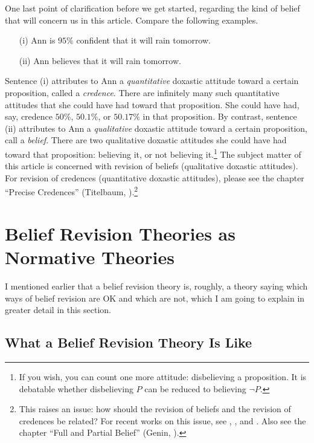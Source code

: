 One last point of clarification before we get started, regarding the kind of belief that will concern us in this article. Compare the following examples.
\begin{itemize}
	\item[(i)]  Ann is $95\%$ confident that it will rain tomorrow.
	\item[(ii)] Ann believes that it will rain tomorrow.
\end{itemize}
Sentence (i) attributes to Ann a {\em quantitative} doxastic attitude toward a certain proposition, called a {\em credence}. There are infinitely many such quantitative attitudes that she could have had toward that proposition. She could have had, say, credence $50\%$, $50.1\%$, or $50.17\%$ in that proposition. By contrast, sentence (ii) attributes to Ann a {\em qualitative} doxastic attitude toward a certain proposition, call a {\em belief}. There are two qualitative doxastic attitudes she could have had toward that proposition: believing it, or not believing it.\footnote
	{If you wish, you can count one more attitude: disbelieving a proposition. It is debatable whether disbelieving $P$ can be reduced to believing $\neg P$.} 
The subject matter of this article is concerned with revision of beliefs (qualitative doxastic attitudes). For revision of credences (quantitative doxastic attitudes), please see the chapter ``Precise Credences'' (Titelbaum, ).\footnote
	{This raises an issue: how should the revision of beliefs and the revision of credences be related? For recent works on this issue, see \citet*{arlo2012belief}, \citet*{lin2012propositional}, and \citet{leitgeb2014stability}. Also see the chapter ``Full and Partial Belief'' (Genin, ).} 


\section{Belief Revision Theories as Normative Theories}\label{lin-normative}

I mentioned earlier that a belief revision theory is, roughly, a theory saying which ways of belief revision are OK and which are not, which I am going to explain in greater detail in this section. 

\subsection{What a Belief Revision Theory Is Like}\label{sec-composers}

